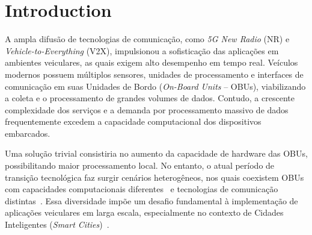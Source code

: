 \documentclass[iicol]{sn-jnl}
\begin{document}
\section{Introduction}\label{sec_introduction}
A ampla difusão de tecnologias de comunicação, como \textit{5G New Radio} (NR) e \textit{Vehicle-to-Everything} (V2X), impulsionou a sofisticação das aplicações em ambientes veiculares, as quais exigem alto desempenho em tempo real. Veículos modernos possuem múltiplos sensores, unidades de processamento e interfaces de comunicação em suas Unidades de Bordo (\textit{On-Board Units} -- OBUs), viabilizando a coleta e o processamento de grandes volumes de dados. Contudo, a crescente complexidade dos serviços e a demanda por processamento massivo de dados frequentemente excedem a capacidade computacional dos dispositivos embarcados.

Uma solução trivial consistiria no aumento da capacidade de hardware das OBUs, possibilitando maior processamento local. No entanto, o atual período de transição tecnológica faz surgir cenários heterogêneos, nos quais coexistem OBUs com capacidades computacionais diferentes~\cite{luo2024} e tecnologias de comunicação distintas~\cite{zheng2015}. Essa diversidade impõe um desafio fundamental à implementação de aplicações veiculares em larga escala, especialmente no contexto de Cidades Inteligentes (\textit{Smart Cities})~\cite{luo2024}.
\end{document}

